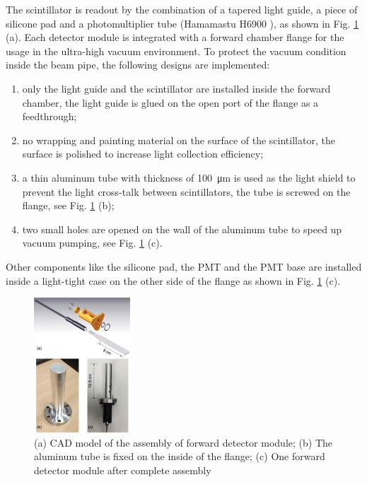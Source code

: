 \documentclass[number,5p]{elsarticle}
\begin{document}
The scintillator is readout by the combination of a tapered light guide, a piece of silicone pad and a
photomultiplier tube (Hamamastu H6900 \cite{hamamatsu}), as shown in Fig. \ref{fig:forward_module} (a).
Each detector module is integrated with a forward chamber flange for the usage
in the ultra-high vacuum environment.
To protect the vacuum condition inside the beam pipe, the following designs are implemented:
\begin{enumerate}
\item only the light guide and the scintillator are installed inside the forward chamber, the light guide is glued on the open port of the flange as a feedthrough;
\item no wrapping and painting material on the surface of the scintillator, the surface is polished to increase light collection efficiency;
\item a thin aluminum tube with thickness of \SI{100}{\micro\meter} is used as
  the light shield to prevent the light cross-talk between scintillators, the tube is screwed on the flange, see Fig. \ref{fig:forward_module} (b);
\item two small holes are opened on the wall of the aluminum tube to speed up vacuum pumping, see Fig. \ref{fig:forward_module} (c).
\end{enumerate}
Other components like the silicone pad, the PMT and the PMT base are installed inside a light-tight case on the other side of the flange as shown in Fig. \ref{fig:forward_module} (c).
\begin{figure}[htbp]
  \centering
  \includegraphics[width=0.32\textwidth]{./forward_module.png}
  \caption{(a) CAD model of the assembly of forward detector module; (b) The aluminum tube is fixed on the inside of the flange; (c) One forward detector module after complete assembly}
  \label{fig:forward_module}
\end{figure}
\end{document}
